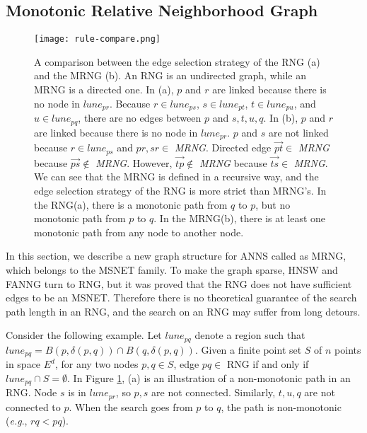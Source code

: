\documentclass{vldb}
\def\eg {\emph{e.g}.} \def\Eg{\emph{E.g}.}
\begin{document}
\subsection{Monotonic Relative Neighborhood Graph}
\label{MRNG}
\begin{figure}[t]
\begin{center}
\texttt{[image: rule-compare.png]}
\end{center}
   \caption{A comparison between the edge selection strategy of the RNG (a) and the MRNG (b). An RNG is an undirected graph, while an MRNG is a directed one. In (a), $p$ and $r$ are linked because there is no node in $lune_{pr}$. Because $r \in lune_{ps}$, $s \in lune_{pt}$, $t \in lune_{pu}$, and $u \in lune_{pq}$, there are no edges between $p$ and $s,t,u,q$. In (b), $p$ and $r$ are linked because there is no node in $lune_{pr}$. $p$ and $s$ are not linked because $r \in lune_{ps}$ and $pr, sr \in$ \textit{MRNG}. Directed edge $\overset{\longrightarrow}{pt} \in$ \textit{MRNG} because $\overset{\longrightarrow}{ps} \notin$ \textit{MRNG}. However, $\overset{\longrightarrow}{tp} \notin$ \textit{MRNG} because $\overset{\longrightarrow}{ts} \in$ \textit{MRNG}. We can see that the MRNG is defined in a recursive way, and the edge selection strategy of the RNG is more strict than MRNG's. In the RNG(a), there is a monotonic path from $q$ to $p$, but no monotonic path from $p$ to $q$. In the MRNG(b), there is at least one monotonic path from any node to another node.}
\label{rulecompare}
\end{figure}

In this section, we describe a new graph structure for ANNS called as MRNG, which belongs to the MSNET family. To make the graph sparse, HNSW and FANNG turn to RNG\cite{toussaint1980relative}, but it was proved that the RNG does not have sufficient edges to be an MSNET\cite{dearholt1988monotonic}. Therefore there is no theoretical guarantee of the search path length in an RNG, and the search on an RNG may suffer from long detours.

Consider the following example. Let $lune_{pq}$ denote a region such that $lune_{pq} = B(p,\delta(p,q)) \cap B(q,\delta(p,q)) $\cite{jaromczyk1992relative}. Given a finite point set $S$ of $n$ points in space $E^d$, for any two nodes $p,q \in S$, edge $pq \in$ RNG if and only if $lune_{pq} \cap S = \emptyset$. In Figure \ref{rulecompare}, (a) is an illustration of a non-monotonic path in an RNG. Node $s$ is in $lune_{pr}$, so $p, s$ are not connected. Similarly, $t, u, q$ are not connected to $p$. When the search goes from $p$ to $q$, the path is non-monotonic (\eg, $rq < pq$). 
\end{document}

